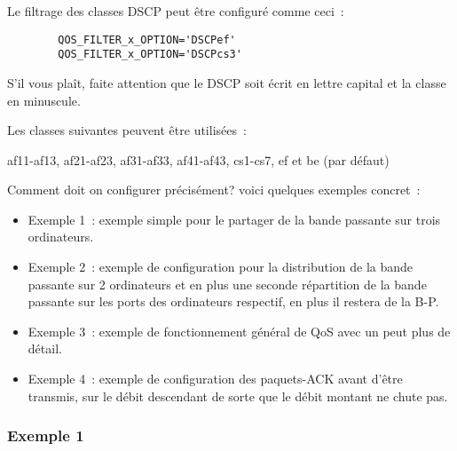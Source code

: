\begin{description}
\begin{description}
\begin{description}
    Le filtrage des classes DSCP peut être configuré comme ceci~:

\begin{example}
\begin{verbatim}
        QOS_FILTER_x_OPTION='DSCPef'
        QOS_FILTER_x_OPTION='DSCPcs3'
\end{verbatim}
\end{example}

    S'il vous plaît, faite attention que le DSCP soit écrit en lettre capital
    et la classe en minuscule.

    Les classes suivantes peuvent être utilisées~:

    af11-af13, af21-af23, af31-af33, af41-af43, cs1-cs7, ef et be (par défaut)

\end{description}
    \end{description}
    \end{description}



    Comment doit on configurer  précisément? voici
    quelques exemples concret~:

    \begin{itemize}
  \item Exemple 1~: exemple simple pour le partager de la bande passante
     sur trois ordinateurs.

  \item Exemple 2~: exemple de configuration pour la distribution de la
    bande passante sur 2 ordinateurs et en plus une seconde répartition
    de la bande passante sur les ports des ordinateurs respectif, en plus
    il restera de la B-P.

  \item Exemple 3~: exemple de fonctionnement général de QoS avec un peut
    plus de détail.

  \item Exemple 4~: exemple de configuration des paquets-ACK avant d'être
    transmis, sur le débit descendant de sorte que le débit montant ne chute pas.
    \end{itemize}



\subsubsection{Exemple 1}



